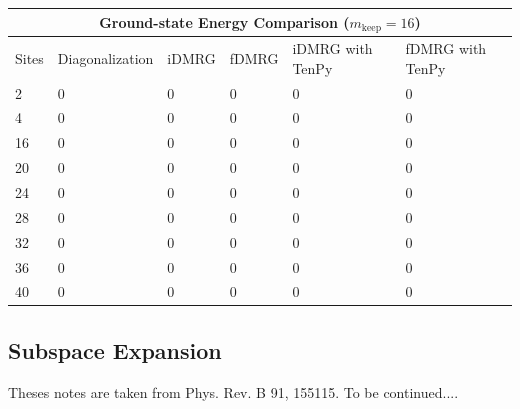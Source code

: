 \documentclass{article}
\begin{document}
\begin{center}
\renewcommand{\arraystretch}{1.15}
\begin{tabular}{|p{0.75cm}|p{2.5cm}|p{1.5cm}|p{1.5cm}|p{3.2cm}|p{3.2cm}|}
 \hline
 \multicolumn{6}{|c|}{Ground-state Energy Comparison ($m_{\text{keep}}=16$)}\\
 \hline
 Sites & Diagonalization & iDMRG & fDMRG & iDMRG with TenPy & fDMRG with TenPy \\
 \hline
 2  & 0 & 0 & 0 & 0 & 0 \\
 4  & 0 & 0 & 0 & 0 & 0 \\
 16 & 0 & 0 & 0 & 0 & 0 \\
 20 & 0 & 0 & 0 & 0 & 0 \\
 24 & 0 & 0 & 0 & 0 & 0 \\
 28 & 0 & 0 & 0 & 0 & 0 \\
 32 & 0 & 0 & 0 & 0 & 0 \\
 36 & 0 & 0 & 0 & 0 & 0 \\
 40 & 0 & 0 & 0 & 0 & 0 \\
 \hline
\end{tabular}
\end{center}

\subsection{Subspace Expansion}

\noindent Theses notes are taken from Phys. Rev. B 91, 155115. To be continued....
\end{document}
